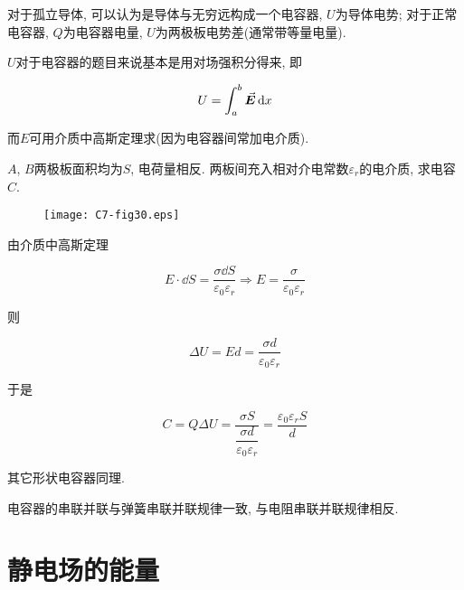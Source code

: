 对于孤立导体, 可以认为是导体与无穷远构成一个电容器, $U$为导体电势; 对于正常电容器, $Q$为电容器电量, $U$为两极板电势差(通常带等量电量). 

$U$对于电容器的题目来说基本是用对场强积分得来, 即

\begin{equation}
	U = \int_{a}^{b} \va*{E} \dd{x} \label{C7-eq21}
\end{equation}

而$E$可用介质中高斯定理求(因为电容器间常加电介质).

\begin{example}
	$A$, $B$两极板面积均为$S$, 电荷量相反. 两板间充入相对介电常数$\varepsilon_r$的电介质, 求电容$C$.
	
	\begin{figure}[H]
		\centering
		\texttt{[image: C7-fig30.eps]}
	\end{figure}
	
	\begin{solution}
		
		由介质中高斯定理
		
		\begin{equation*}
			E \cdot \dd{S} = \dfrac{\sigma \dd{S}}{\varepsilon_0\varepsilon_r} \Rightarrow E = \dfrac{\sigma}{\varepsilon_0\varepsilon_r}
		\end{equation*}
		
		则
		
		\begin{equation*}
			\Delta U = Ed = \dfrac{\sigma d}{\varepsilon_0 \varepsilon_r}
		\end{equation*}
	
	    于是
		
		\begin{equation*}
			C = Q \Delta U = \dfrac{\sigma S}{\dfrac{\sigma d}{\varepsilon_0 \varepsilon_r}} = \dfrac{\varepsilon_0 \varepsilon_r S}{d}
		\end{equation*}
		
		其它形状电容器同理. 
		
	\end{solution}
	
\end{example}

电容器的串联并联与弹簧串联并联规律一致, 与电阻串联并联规律相反. 

\section{静电场的能量}


